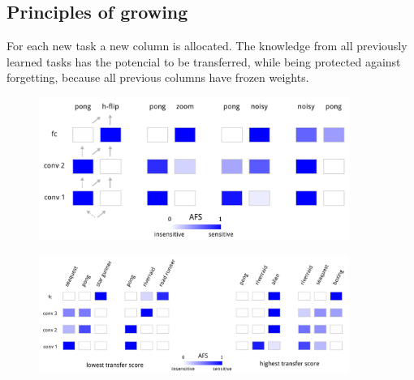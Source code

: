 \documentclass[a4paper,twocolumn]{article}
\begin{document}
\subsection*{Principles of growing}
For each new task a new column is allocated. The knowledge from all previously learned tasks has the potencial to be transferred, while being protected against forgetting, because all previous columns have frozen weights.


    \begin{figure}[ht]
        \centering
        \includegraphics[width=0.9\textwidth]{2-column.png}
    \end{figure}

    \begin{figure}[ht]
        \centering
        \includegraphics[width=0.9\textwidth]{3-column.png}
    \end{figure}
\end{document}
